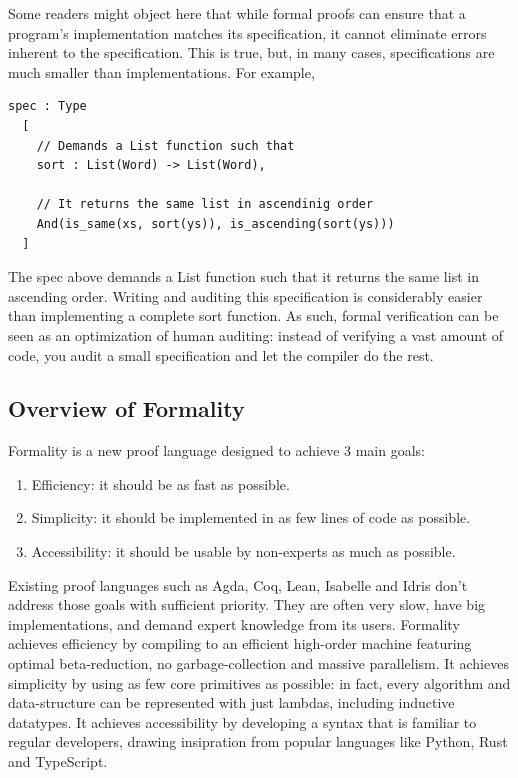 \documentclass{article}
\theoremstyle{definition}
\theoremstyle{theorem}
\begin{document}
Some readers might object here that while formal proofs can ensure that a
program's implementation matches its specification, it cannot eliminate errors
inherent to the specification. This is true, but, in many cases, specifications
are much smaller than implementations. For example,

\begin{lstlisting}
spec : Type
  [
    // Demands a List function such that
    sort : List(Word) -> List(Word),

    // It returns the same list in ascendinig order
    And(is_same(xs, sort(ys)), is_ascending(sort(ys)))
  ]
\end{lstlisting}

The spec above demands a List function such that it returns the same list in
ascending order. Writing and auditing this specification is considerably easier
than implementing a complete sort function. As such, formal verification can be
seen as an optimization of human auditing: instead of verifying a vast amount of
code, you audit a small specification and let the compiler do the rest.

\subsection{Overview of Formality}

Formality is a new proof language designed to achieve 3 main goals:

\begin{enumerate}
\item Efficiency: it should be as fast as possible.
\item Simplicity: it should be implemented in as few lines of code as possible.
\item Accessibility: it should be usable by non-experts as much as possible.
\end{enumerate}

Existing proof languages such as Agda, Coq, Lean, Isabelle and Idris don't
address those goals with sufficient priority. They are often very slow, have big
implementations, and demand expert knowledge from its users. Formality achieves
efficiency by compiling to an efficient high-order machine featuring optimal
beta-reduction, no garbage-collection and massive parallelism. It achieves
simplicity by using as few core primitives as possible: in fact, every algorithm
and data-structure can be represented with just lambdas, including inductive
datatypes. It achieves accessibility by developing a syntax that is familiar to
regular developers, drawing insipration from popular languages like Python, Rust
and TypeScript.
\end{document}
